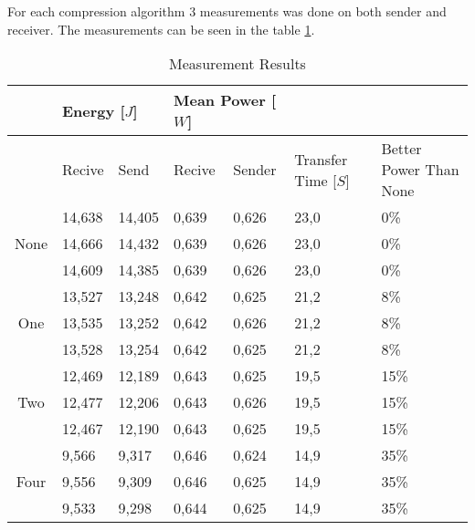 For each compression algorithm 3 measurements was done on both sender and receiver. 
The measurements can be seen in the table \ref{tab:MeasurementResults}.


\begin{table}[h]
	\begin{tabular}{cllllll}

	\cline{2-5} 
	\multicolumn{1}{l}{} 	& \multicolumn{2}{l}{Energy {[$J$]}} & \multicolumn{2}{l}{Mean Power [$W$]} &	&	\\ \hline
	\rowcolor{gr}
	\multicolumn{1}{l}{Bit Removed}	& Recive	& Send	& Recive	& Sender	& \multicolumn{1}{l}{Transfer Time [$S$]} & \multicolumn{1}{l}{Better Power Than None} \\ \hline
	\multicolumn{1}{c}{\multirow{3}{*}{None}} & 14,638	& 14,405	& 0,639	& 0,626	& \multicolumn{1}{l}{23,0}	& \multicolumn{1}{l}{0\%}	\\  
	\multicolumn{1}{c}{}	& 14,666	& 14,432	& 0,639	& 0,626	& \multicolumn{1}{l}{23,0}	& \multicolumn{1}{l}{0\%}	\\ 
	\multicolumn{1}{c}{}	& 14,609	& 14,385	& 0,639	& 0,626	& \multicolumn{1}{l}{23,0}	& \multicolumn{1}{l}{0\%}	\\ \hline
	\multicolumn{1}{c}{\multirow{3}{*}{One}}  & 13,527	& 13,248	& 0,642	& 0,625	& \multicolumn{1}{l}{21,2}	& \multicolumn{1}{l}{8\%}	\\ %
	\multicolumn{1}{c}{}	& 13,535	& 13,252	& 0,642	& 0,626	& \multicolumn{1}{l}{21,2}	& \multicolumn{1}{l}{8\%}	\\ %
	\multicolumn{1}{c}{}	& 13,528	& 13,254	& 0,642	& 0,625	& \multicolumn{1}{l}{21,2}	& \multicolumn{1}{l}{8\%}	\\ \hline
	\multicolumn{1}{c}{\multirow{3}{*}{Two}}  & 12,469	& 12,189	& 0,643	& 0,625	& \multicolumn{1}{l}{19,5}	& \multicolumn{1}{l}{15\%}	\\ %
	\multicolumn{1}{c}{}	& 12,477	& 12,206	& 0,643	& 0,626	& \multicolumn{1}{l}{19,5}	& \multicolumn{1}{l}{15\%}	\\ %
	\multicolumn{1}{c}{}	& 12,467	& 12,190	& 0,643	& 0,625	& \multicolumn{1}{l}{19,5}	& \multicolumn{1}{l}{15\%}	\\ \hline
	\multicolumn{1}{c}{\multirow{3}{*}{Four}} & 9,566	& 9,317	& 0,646	& 0,624	& \multicolumn{1}{l}{14,9}	& \multicolumn{1}{l}{35\%}	\\ %
	\multicolumn{1}{c}{}	& 9,556	& 9,309	& 0,646	& 0,625	& \multicolumn{1}{l}{14,9}	& \multicolumn{1}{l}{35\%}	\\ %
	\multicolumn{1}{c}{}	& 9,533	& 9,298	& 0,644	& 0,625	& \multicolumn{1}{l}{14,9}	& \multicolumn{1}{l}{35\%}	\\ \hline
	\end{tabular}

	\caption{Measurement Results }
	\label{tab:MeasurementResults}
\end{table}
